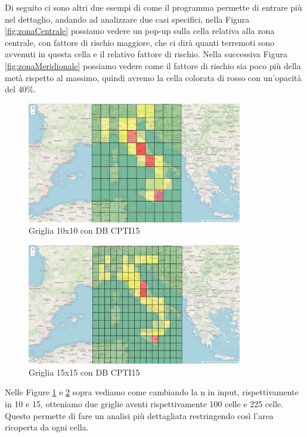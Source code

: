 Di seguito ci sono altri due esempi di come il programma permette di entrare pi\`u nel dettaglio, andando ad analizzare due casi specifici, nella Figura \ref{fig:zonaCentrale} possiamo vedere un pop-up sulla cella relativa alla zona centrale, con fattore di rischio maggiore, che ci dir\`a quanti terremoti sono avvenuti in questa cella e il relativo fattore di rischio. Nella successiva Figura \ref{fig:zonaMeridionale} possiamo vedere come il fattore di rischio sia poco pi\`u della met\`a rispetto al massimo, quindi avremo la cella colorata di rosso con un'opacit\`a del 40\%.

\begin{figure}[H]
   \centering
   \includegraphics[width=0.835\textwidth]{images/10x10_CPTI15.jpg}
   \caption{Griglia 10x10 con DB CPTI15}
   \label{fig:10x10CPTI15}
\end{figure}

\begin{figure}[H]
   \centering
   \includegraphics[width=0.835\textwidth]{images/15x15_CPTI15.jpg}
   \caption{Griglia 15x15 con DB CPTI15}
   \label{fig:15x15CPTI15}
\end{figure}

Nelle Figure \ref{fig:10x10CPTI15} e \ref{fig:15x15CPTI15} sopra vediamo come cambiando la n in input, rispettivamente in 10 e 15, otteniamo due griglie aventi rispettivamente 100 celle e 225 celle. Questo permette di fare un analisi pi\`u dettagliata restringendo cos\`i l'area ricoperta da ogni cella.

